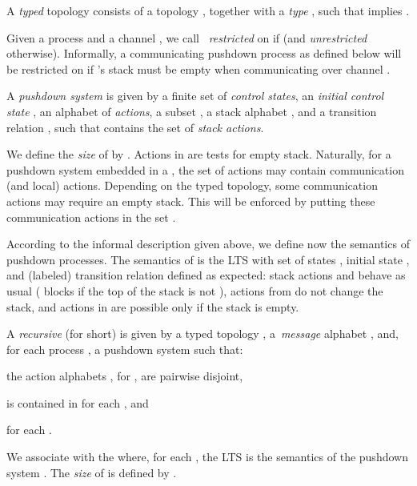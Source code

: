 \documentclass{LMCS}
\newenvironment{definition}{\begin{defi}}{\end{defi}}
\begin{document}
\begin{definition}
  A \emph{typed} topology  consists of a topology
  , together with a \emph{type} , such that  implies .
\label{def:oriented}
\end{definition}

Given a process  and a channel , we call
~\emph{restricted} on  if  (and
\emph{unrestricted} otherwise). Informally, a communicating pushdown
process  as defined below will be restricted on  if 's stack
must be empty when communicating over channel .
































\begin{definition} 
  A \emph{pushdown system}  is given by a finite set  of
  \emph{control states}, an \emph{initial control state} , an alphabet  of \emph{actions},
  a subset ,
  a stack alphabet , and
  a transition relation , such that
   contains the set 
  of \emph{stack actions}.
\end{definition}
We define the \emph{size} of  by .
Actions in  are tests for
empty stack.
Naturally, for a pushdown system embedded in a \qcp, the set of actions
 may contain communication (and local) actions.
Depending on the typed topology, some communication actions
may require an empty stack.  This will be enforced by putting these
communication actions in the set .

According to the informal description given above, we define now the
semantics of pushdown processes.
The semantics of 
is the LTS  with set of states
, initial state ,
and (labeled) transition relation  defined as expected:
stack actions  and  behave as usual ( blocks
if the top of the stack is not ), actions from 
do not change the stack, and actions in  are possible only if
the stack is empty.



\begin{definition}
  A \emph{recursive \qcp} (\rqcp for short)
   is given by a typed
  topology , a~\emph{message} alphabet , and,
  for each  process ,  a
  pushdown system
   such that:
  \begin{iteMize}{}
  \item the action alphabets , for , are pairwise disjoint,
  \item  is contained in
     for each , and
  \item  for each .
  \end{iteMize}
\end{definition}
We associate with  the \qcp 
where, for each , the LTS  is the semantics of the
pushdown system .
The \emph{size} of  is defined by
.
\end{document}
